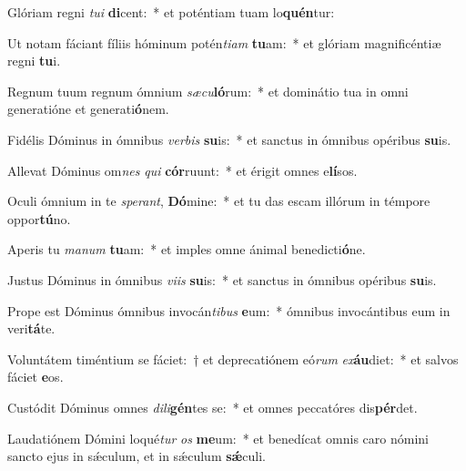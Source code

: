 \item Glóriam regni \textit{tu}\textit{i} \textbf{di}cent:~* et poténtiam tuam lo\textbf{quén}tur:
\item Ut notam fáciant fíliis hóminum potén\textit{ti}\textit{am} \textbf{tu}am:~* et glóriam magnificéntiæ regni \textbf{tu}i.
\item Regnum tuum regnum ómnium \textit{sæ}\textit{cu}\textbf{ló}rum:~* et dominátio tua in omni generatióne et generati\textbf{ó}nem.
\item Fidélis Dóminus in ómnibus \textit{ver}\textit{bis} \textbf{su}is:~* et sanctus in ómnibus opéribus \textbf{su}is.
\item Allevat Dóminus om\textit{nes} \textit{qui} \textbf{cór}ruunt:~* et érigit omnes e\textbf{lí}sos.
\item Oculi ómnium in te \textit{spe}\textit{rant}, \textbf{Dó}mine:~* et tu das escam illórum in témpore oppor\textbf{tú}no.
\item Aperis tu \textit{ma}\textit{num} \textbf{tu}am:~* et imples omne ánimal benedicti\textbf{ó}ne.
\item Justus Dóminus in ómnibus \textit{vi}\textit{is} \textbf{su}is:~* et sanctus in ómnibus opéribus \textbf{su}is.
\item Prope est Dóminus ómnibus invocán\textit{ti}\textit{bus} \textbf{e}um:~* ómnibus invocántibus eum in veri\textbf{tá}te.
\item Voluntátem timéntium se fáciet:~† et deprecatiónem eó\textit{rum} \textit{ex}\textbf{áu}diet:~* et salvos fáciet \textbf{e}os.
\item Custódit Dóminus omnes \textit{di}\textit{li}\textbf{gén}tes se:~* et omnes peccatóres dis\textbf{pér}det.
\item Laudatiónem Dómini loqué\textit{tur} \textit{os} \textbf{me}um:~* et benedícat omnis caro nómini sancto ejus in sǽculum, et in sǽculum \textbf{sǽ}culi.
